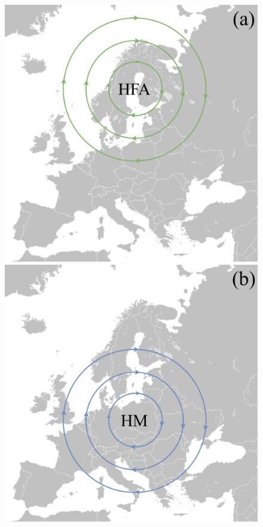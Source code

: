\vspace{1cm}

\begin{figure}[H]
    \centering
    \begin{minipage}{0.32\textwidth}
        \includegraphics[width=\linewidth]{Figures/HFA.pdf}
    \end{minipage}
    \hfill
    \begin{minipage}{0.32\textwidth}
        \includegraphics[width=\linewidth]{Figures/HM.pdf}

\end{minipage}
\end{figure}
